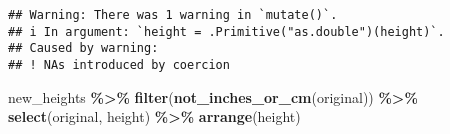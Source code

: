 \documentclass[
]{article}
\newenvironment{Shaded}{\begin{snugshade}}{\end{snugshade}}
\newcommand{\FunctionTok}[1]{\textcolor[rgb]{0.13,0.29,0.53}{\textbf{#1}}}
\newcommand{\NormalTok}[1]{#1}
\newcommand{\SpecialCharTok}[1]{\textcolor[rgb]{0.81,0.36,0.00}{\textbf{#1}}}
\begin{document}
\begin{verbatim}
## Warning: There was 1 warning in `mutate()`.
## i In argument: `height = .Primitive("as.double")(height)`.
## Caused by warning:
## ! NAs introduced by coercion
\end{verbatim}

\begin{Shaded}
\begin{Highlighting}[]
\NormalTok{new\_heights }\SpecialCharTok{\%\textgreater{}\%} \FunctionTok{filter}\NormalTok{(}\FunctionTok{not\_inches\_or\_cm}\NormalTok{(original)) }\SpecialCharTok{\%\textgreater{}\%}
  \FunctionTok{select}\NormalTok{(original, height) }\SpecialCharTok{\%\textgreater{}\%} 
  \FunctionTok{arrange}\NormalTok{(height)}
\end{Highlighting}
\end{Shaded}
\end{document}
